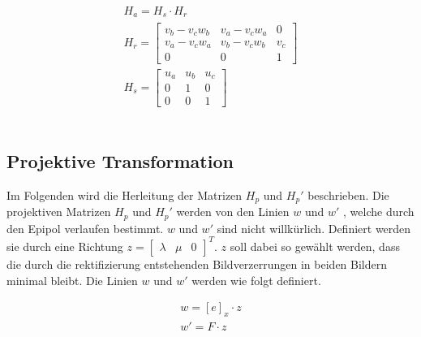\begin{gather}
	H_a = H_s \cdot H_r\\
	H_r = 
	\begin{bmatrix}
		v_b-v_cw_b&	v_a-v_cw_a&0\\
		v_a-v_cw_a&v_b-v_cw_b&v_c\\
		0&0&1
	\end{bmatrix} \label{eq:DefHr}\\
	H_s = 
	\begin{bmatrix}
		u_a&u_b&u_c\\
		0&1&0\\
		0&0&1
	\end{bmatrix}\label{eq:DefHs}
\end{gather}\\


\subsection{Projektive Transformation}

Im Folgenden wird die Herleitung der Matrizen $H_p$ und $H_p'$ beschrieben. Die projektiven Matrizen $H_p$ und $H_p'$ werden von den Linien $w$ und $w'$ , welche durch den Epipol verlaufen bestimmt. $w$ und $w'$ sind nicht willkürlich. Definiert werden sie durch eine Richtung $z = \begin{bmatrix}
\lambda&\mu&0\end{bmatrix}^T$. $z$ soll dabei so gewählt werden, dass die durch die rektifizierung entstehenden Bildverzerrungen in beiden Bildern minimal bleibt. Die Linien $w$ und $w'$ werden wie folgt definiert.


\begin{gather}
	w = [e]_x \cdot z \label{eq:w}\\ 
	w'= F\cdot z \label{eq:w'}
\end{gather}\\


